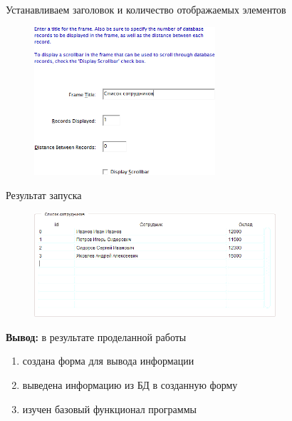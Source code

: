 \documentclass[pscyr, 12pt]{hedlab}
\begin{document}
    Устанавливаем заголовок и количество отображаемых элементов
    \begin{figure}[ht!]
        \center
        \includegraphics[width=0.6\textwidth]{lab05_04}
    \end{figure}

    Результат запуска
    \begin{figure}[ht!]
        \center
        \includegraphics[width=0.8\textwidth]{lab05_05}
    \end{figure}

    \noindent\textbf{Вывод:} в результате проделанной работы
    \vspace*{-1em}
    \begin{enumerate}\itemsep-5pt
        \item создана форма для вывода информации
        \item выведена информацию из БД в созданную форму
        \item изучен базовый функционал программы
    \end{enumerate}
\end{document}
